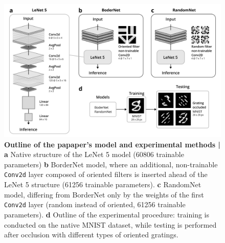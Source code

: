 \documentclass[a4paper, 10pt]{article}
\begin{document}
\begin{figure}
  \centering
  \includegraphics[width=\textwidth]{methods-bnw.png}
  \caption{
    \textbf{Outline of the papaper's model and experimental methods |} \textbf{a}
    Native structure of the LeNet 5 model (60806 trainable parameters) \textbf{b}
    BorderNet model, where an additional, non-trainable \texttt{Conv2d} layer
    composed of oriented filters is inserted ahead of the LeNet 5 structure
    (61256 trainable parameters). 
    \textbf{c} RandomNet model, differing from BorderNet only by the weights of
    the first \texttt{Conv2d} layer (random instead of oriented, 61256 trainable
    parameters). \textbf{d} Outline of the experimental procedure: training is
    conducted on the native MNIST dataset, while testing is performed after
    occlusion with different types of oriented gratings.
  }
\end{figure}
\end{document}
